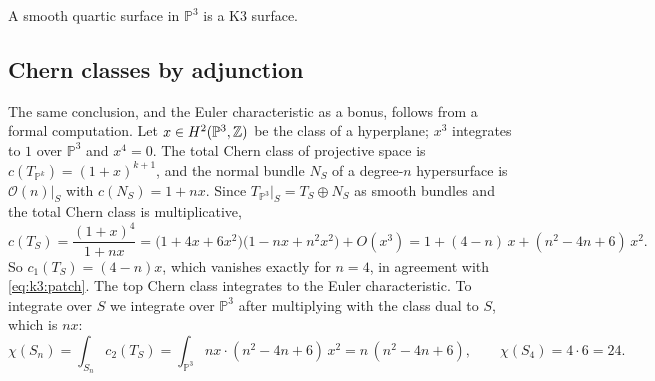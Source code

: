 \begin{proposition}\label{prop:k3:quartic}
A smooth quartic surface in $\mathbb{P}^3$ is a K3 surface. \TL{}
\end{proposition}

\subsection{Chern classes by adjunction}

The same conclusion, and the Euler characteristic as a bonus, follows from a formal
computation. Let $x\in H^2(\mathbb{P}^3,\mathbb{Z})$ be the class of a hyperplane; $x^3$ integrates to
$1$ over $\mathbb{P}^3$ and $x^4=0$. The total Chern class of projective space is
$c(T_{\mathbb{P}^k})=(1+x)^{k+1}$, and the normal bundle $N_S$ of a degree-$n$ hypersurface is
$\mathcal{O}(n)|_S$ with $c(N_S)=1+nx$. Since $T_{\mathbb{P}^3}|_S=T_S\oplus N_S$ as smooth
bundles and the total Chern class is multiplicative,
\begin{equation}\label{eq:k3:chern}
  c(T_S)=\frac{(1+x)^4}{1+nx}
  =\big(1+4x+6x^2\big)\big(1-nx+n^2x^2\big)+O(x^3)
  =1+(4-n)\,x+(n^2-4n+6)\,x^2 .
\end{equation}
 So $c_1(T_S)=(4-n)x$, which vanishes exactly for
$n=4$, in agreement with \eqref{eq:k3:patch}. The top Chern class integrates to the Euler
characteristic. To integrate over $S$ we integrate over
$\mathbb{P}^3$ after multiplying with the class dual to $S$, which is $nx$:
\begin{equation}\label{eq:k3:chi24}
  \chi(S_n)=\int_{S_n}c_2(T_S)=\int_{\mathbb{P}^3} nx\cdot(n^2-4n+6)\,x^2=n\,(n^2-4n+6),
  \qquad \chi(S_4)=4\cdot6=24 .
\end{equation}


